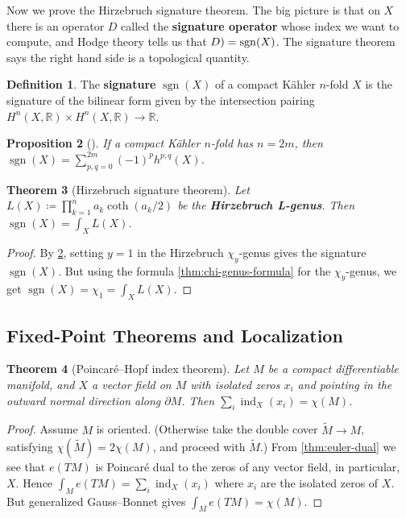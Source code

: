 \documentclass{report}
\theoremstyle{plain}
\newtheorem{theorem}{Theorem}[section]
\newtheorem{proposition}[theorem]{Proposition}
\theoremstyle{definition}
\newtheorem{definition}[theorem]{Definition}
\theoremstyle{remark}
\newcommand{\di}{\partial}
\newcommand{\bR}{\mathbb{R}}
\DeclareMathOperator{\ind}{ind}
\DeclareMathOperator{\sgn}{sgn}
\begin{document}
Now we prove the Hirzebruch signature theorem. The big picture is that
on $X$ there is an operator $D$ called the {\bf signature operator}
whose index we want to compute, and Hodge theory tells us that
$\index(D) = \sgn(X)$. The signature theorem says the right hand side
is a topological quantity.

\begin{definition}
  The {\bf signature} $\sgn(X)$ of a compact K\"ahler $n$-fold $X$ is
  the signature of the bilinear form given by the intersection pairing
  $H^n(X, \bR) \times H^n(X, \bR) \to \bR$.
\end{definition}

\begin{proposition}[{\cite[Corollary 3.3.18]{Huybrechts2005}}] \label{thm:signature-chi}
  If a compact K\"ahler $n$-fold has $n = 2m$, then $\sgn(X) =
  \sum_{p,q=0}^{2m} (-1)^p h^{p,q}(X)$.
\end{proposition}

\begin{theorem}[Hirzebruch signature theorem]
  Let $L(X) \coloneqq \prod_{k=1}^n a_k \coth(a_k/2)$ be the {\bf
    Hirzebruch L-genus}. Then $\sgn(X) = \int_X L(X)$.
\end{theorem}

\begin{proof}
  By \ref{thm:signature-chi}, setting $y = 1$ in the Hirzebruch
  $\chi_y$-genus gives the signature $\sgn(X)$. But using the formula
  \ref{thm:chi-genus-formula} for the $\chi_y$-genus, we get $\sgn(X)
  = \chi_1 = \int_X L(X)$.
\end{proof}

\subsection{Fixed-Point Theorems and Localization}

\begin{theorem}[Poincar\'e--Hopf index theorem]
  Let $M$ be a compact differentiable manifold, and $X$ a vector field
  on $M$ with isolated zeros $x_i$ and pointing in the outward normal
  direction along $\di M$. Then $\sum_i \ind_X(x_i) = \chi(M)$.
\end{theorem}

\begin{proof}
  Assume $M$ is oriented. (Otherwise take the double cover $\tilde{M}
  \to M$, satisfying $\chi(\tilde{M}) = 2\chi(M)$, and proceed with
  $\tilde{M}$.) From \ref{thm:euler-dual} we see that $e(TM)$ is
  Poincar\'e dual to the zeros of any vector field, in particular,
  $X$. Hence $\int_M e(TM) = \sum_i \ind_X(x_i)$ where $x_i$ are the
  isolated zeros of $X$. But generalized Gauss--Bonnet gives $\int_M
  e(TM) = \chi(M)$.
\end{proof}
\end{document}
